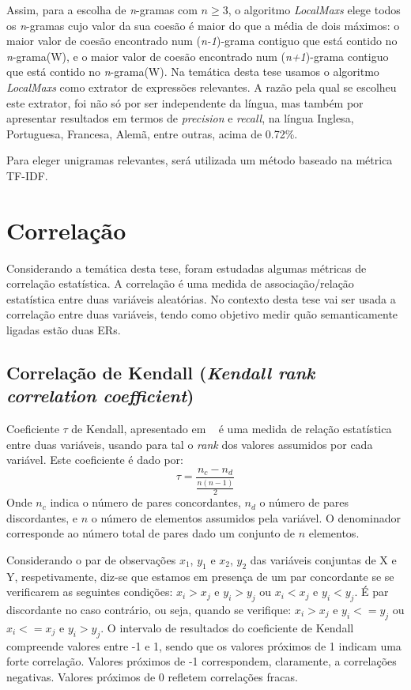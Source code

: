 Assim, para a escolha de \textit{n}-gramas com $n\geq3$, o algoritmo \textit{LocalMaxs} elege todos os \textit{n}-gramas cujo valor da sua coesão é maior do que a média de dois máximos: o maior valor de coesão encontrado num (\textit{n-1})-grama contiguo que está contido no \textit{n}-grama(W), e o maior valor de coesão encontrado num (\textit{n+1})-grama contiguo que está contido no \textit{n}-grama(W).
Na temática desta tese usamos o algoritmo \textit{LocalMaxs} como extrator de expressões relevantes. A razão pela qual se escolheu este extrator, foi não só por ser independente da língua, mas também por apresentar resultados em termos de \textit{precision} e \textit{recall}, na língua Inglesa, Portuguesa, Francesa, Alemã, entre outras, acima de 0.72\%.

Para eleger unigramas relevantes, será utilizada um método baseado na métrica TF-IDF.


\section{Correlação} %
\label{sec:correlação}
Considerando a temática desta tese, foram estudadas algumas métricas de correlação estatística. A correlação é uma medida de associação/relação estatística entre duas variáveis aleatórias. No contexto desta tese vai ser usada a correlação entre duas variáveis, tendo como objetivo medir quão semanticamente ligadas estão duas ERs.

\subsection{Correlação de Kendall (\textit{Kendall rank correlation coefficient})}
Coeficiente $\tau$ de Kendall, apresentado  em ~\cite{doi:10.1093/biomet/30.1-2.81} é uma medida de relação estatística entre duas variáveis, usando para tal o \textit{rank} dos valores assumidos por cada variável. Este coeficiente é dado por:
\begin{equation}
    \tau = \frac{n_{c} - n_{d}}{\frac{n(n-1)}{2}}
\end{equation}
Onde $n_{c}$ indica o número de pares concordantes, $n_{d}$ o número de pares discordantes, e $n$ o número de elementos assumidos pela variável. O denominador corresponde ao número total de pares dado um conjunto de $n$ elementos.

Considerando o par de observações $x_{1}$, $y_{1}$ e $x_{2}$, $y_{2}$ das variáveis conjuntas de X e Y, respetivamente, diz-se que estamos em presença de um par concordante se se verificarem as seguintes condições:
$x_{i} > x_{j}$ e $y_{i} > y_{j}$ ou $x_{i} < x_{j}$ e $y_{i} < y_{j}$.
É par discordante no caso contrário, ou seja, quando se verifique: $x_{i} > x_{j}$ e $y_{i} <= y_{j}$ ou $x_{i} <= x_{j}$ e $y_{i} > y_{j}$.
O intervalo de resultados do coeficiente de Kendall compreende valores entre -1 e 1, sendo que os valores próximos de 1 indicam uma forte correlação. Valores próximos de -1 correspondem, claramente, a correlações negativas. Valores próximos de 0 refletem correlações fracas.

